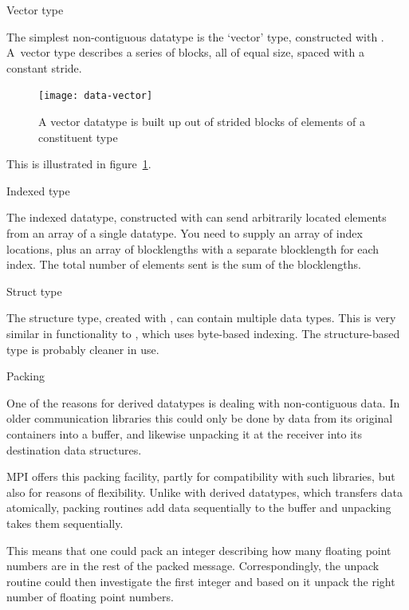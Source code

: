  {Vector type}

The simplest non-contiguous datatype is the `vector' type, constructed with
. A~vector type describes a series of blocks, all 
of equal size, spaced with a constant stride.
\begin{figure}[ht]
  \texttt{[image: data-vector]}
  \caption{A vector datatype is built up out of strided blocks of elements of a constituent type}
  \label{fig:data-vector}
\end{figure}
This is illustrated in figure~\ref{fig:data-vector}.

 {Indexed type}

The indexed datatype, constructed with 
can send arbitrarily located elements from an array of a single datatype.
You need to supply an array of index locations, plus an array of blocklengths
with a separate blocklength for each index. The total number of elements sent
is the sum of the blocklengths.

 {Struct type}

The structure type, created with ,
can contain multiple data types.
This is very similar in functionality to ,
which uses byte-based indexing. The structure-based type is probably cleaner
in use.


 {Packing}

One of the reasons for derived datatypes is dealing with non-contiguous data.
In older communication libraries this could only be done by  data
from its original containers into a buffer, and likewise unpacking it at the
receiver into its destination data structures.

MPI offers this packing facility, partly for compatibility with such libraries,
but also for reasons of flexibility. Unlike with derived datatypes,
which transfers data atomically, packing routines add data sequentially
to the buffer and unpacking takes them sequentially. 

This means that 
one could pack an integer describing how many floating point numbers
are in the rest of the packed message. 
Correspondingly, the unpack routine could then investigate the first integer
and based on it unpack the right number of floating point numbers.

